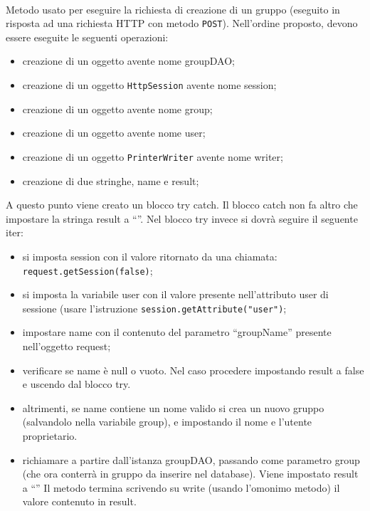 \begin{description}
	\item{}\\	
	Metodo usato per eseguire la richiesta di creazione di un gruppo (eseguito in risposta ad una richiesta HTTP con metodo \texttt{POST}). Nell'ordine proposto, devono essere eseguite le seguenti operazioni:
	\begin{itemize}
		\item creazione di un oggetto  avente nome groupDAO;
		\item creazione di un oggetto \texttt{HttpSession} avente nome session;
		\item creazione di un oggetto  avente nome group;
		\item creazione di un oggetto  avente nome user;
		\item creazione di un oggetto \texttt{PrinterWriter} avente nome writer;
		\item creazione di due stringhe, name e result;
	\end{itemize}
	A questo punto viene creato un blocco try catch. Il blocco catch non fa altro che impostare la stringa result a ``''. Nel blocco try invece si dovrà seguire il seguente iter:
	\begin{itemize}
		\item si imposta session con il valore ritornato da una chiamata:\\
		\verb|request.getSession(false)|;
		\item si imposta la variabile user con il valore presente nell'attributo user di sessione (usare l'istruzione \verb|session.getAttribute("user")|;
		\item impostare name con il contenuto del parametro ``groupName'' presente nell'oggetto request;
		\item verificare se name è null o vuoto. Nel caso procedere impostando result a false e uscendo dal blocco try.
		\item altrimenti, se name contiene un nome valido si crea un nuovo gruppo (salvandolo nella variabile group), e impostando il nome e l'utente proprietario.
		\item richiamare  a partire dall'istanza groupDAO, passando come parametro group (che ora conterrà in gruppo da inserire nel database). Viene impostato result a ``''
	Il metodo termina scrivendo su write (usando l'omonimo metodo) il valore contenuto in result. 		
	\end{itemize}
	
\end{description}


